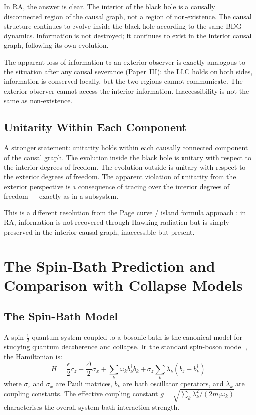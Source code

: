 \documentclass[12pt,a4paper]{article}
\begin{document}
In RA, the answer is clear.  The interior of the black hole is a causally disconnected region of the causal graph, not a region of non-existence.  The causal structure continues to evolve inside the black hole according to the same BDG dynamics.  Information is not destroyed; it continues to exist in the interior causal graph, following its own evolution.

The apparent loss of information to an exterior observer is exactly analogous to the situation after any causal severance (Paper~III): the LLC holds on both sides, information is conserved locally, but the two regions cannot communicate.  The exterior observer cannot access the interior information.  Inaccessibility is not the same as non-existence.

\subsection{Unitarity Within Each Component}

A stronger statement: unitarity holds within each causally connected component of the causal graph.  The evolution inside the black hole is unitary with respect to the interior degrees of freedom.  The evolution outside is unitary with respect to the exterior degrees of freedom.  The apparent violation of unitarity from the exterior perspective is a consequence of tracing over the interior degrees of freedom --- exactly as in a subsystem.

This is a different resolution from the Page curve / island formula approach \cite{Page1993,Penington2020}: in RA, information is not recovered through Hawking radiation but is simply preserved in the interior causal graph, inaccessible but present.


\section{The Spin-Bath Prediction and Comparison with Collapse Models}\label{sec:spinbath}

\subsection{The Spin-Bath Model}

A spin-$\frac{1}{2}$ quantum system coupled to a bosonic bath is the canonical model for studying quantum decoherence and collapse.  In the standard spin-boson model \cite{Leggett1987}, the Hamiltonian is:
\begin{equation}
  H = \frac{\epsilon}{2}\sigma_z + \frac{\Delta}{2}\sigma_x + \sum_k\omega_k b_k^\dagger b_k + \sigma_z\sum_k\lambda_k(b_k+b_k^\dagger)
  \label{eq:spinboson}
\end{equation}
where $\sigma_z$ and $\sigma_x$ are Pauli matrices, $b_k$ are bath oscillator operators, and $\lambda_k$ are coupling constants.  The effective coupling constant $g = \sqrt{\sum_k\lambda_k^2/(2m_k\omega_k)}$ characterises the overall system-bath interaction strength.
\end{document}

